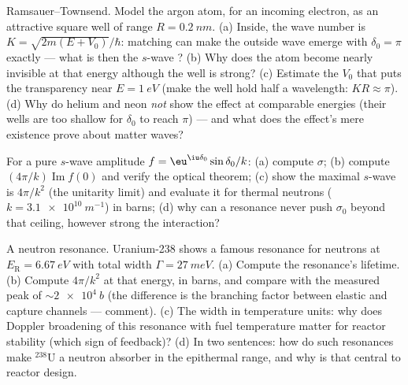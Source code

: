 \begin{exercise}[$\star\star$]\label{exo:b3:scattering-theory:8}
Ramsauer--Townsend. Model the argon atom, for an incoming
electron, as an attractive square well of range $R =
\qty{0.2}{nm}$. (a) Inside, the wave number is $K =
\sqrt{2m(E + V_0)}/\hbar$: matching can make the outside wave
emerge with $\delta_0 = \pi$ exactly --- what is then the $s$-wave
? (b) Why does the atom become nearly invisible at
that energy although the well is strong? (c) Estimate the $V_0$
that puts the transparency near $E = \qty{1}{eV}$ (make the well
hold half a wavelength: $KR \approx \pi$). (d) Why do helium and
neon \emph{not} show the effect at comparable energies (their
wells are too shallow for $\delta_0$ to reach $\pi$) --- and what
does the effect's mere existence prove about matter waves?
\end{exercise}

\begin{exercise}[$\star\star$]\label{exo:b3:scattering-theory:9}
For a pure $s$-wave amplitude $f = \eu^{\iu\delta_0}\sin\delta_0/
k$: (a) compute $\sigma$; (b) compute $(4\pi/k)\operatorname{Im}
f(0)$ and verify the optical theorem; (c) show the maximal
$s$-wave  is $4\pi/k^2$ (the unitarity limit) and
evaluate it for thermal neutrons ($k = \qty{3.1e10}{m^{-1}}$) in
barns; (d) why can a resonance never push $\sigma_0$ beyond that
ceiling, however strong the interaction?
\end{exercise}

\begin{exercise}[$\star\star\star$]\label{exo:b3:scattering-theory:10}
A neutron resonance. Uranium-238 shows a famous resonance for
neutrons at $E_{\text{R}} = \qty{6.67}{eV}$ with total width
$\Gamma = \qty{27}{meV}$. (a) Compute the resonance's lifetime.
(b) Compute $4\pi/k^2$ at that energy, in barns, and compare with
the measured peak of $\sim\qty{2e4}{b}$ (the difference is the
branching factor between elastic and capture channels ---
comment). (c) The width in temperature units: why does Doppler
broadening of this resonance with fuel temperature matter for
reactor stability (which sign of feedback)? (d) In two sentences:
how do such resonances make $^{238}$U a neutron absorber in the
epithermal range, and why is that central to reactor design.
\end{exercise}

